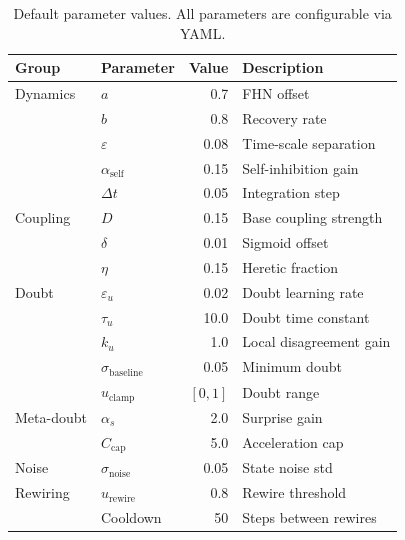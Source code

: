 \documentclass[11pt]{article}
\begin{document}
\begin{table}[ht]
\centering
\caption{Default parameter values. All parameters are configurable via YAML.}
\begin{tabular}{llrl}
\toprule
\textbf{Group} & \textbf{Parameter} & \textbf{Value} & \textbf{Description} \\
\midrule
Dynamics & $a$ & 0.7 & FHN offset \\
         & $b$ & 0.8 & Recovery rate \\
         & $\varepsilon$ & 0.08 & Time-scale separation \\
         & $\alpha_{\text{self}}$ & 0.15 & Self-inhibition gain \\
         & $\Delta t$ & 0.05 & Integration step \\
\midrule
Coupling & $D$ & 0.15 & Base coupling strength \\
         & $\delta$ & 0.01 & Sigmoid offset \\
         & $\eta$ & 0.15 & Heretic fraction \\
\midrule
Doubt    & $\varepsilon_u$ & 0.02 & Doubt learning rate \\
         & $\tau_u$ & 10.0 & Doubt time constant \\
         & $k_u$ & 1.0 & Local disagreement gain \\
         & $\sigma_{\text{baseline}}$ & 0.05 & Minimum doubt \\
         & $u_{\text{clamp}}$ & $[0, 1]$ & Doubt range \\
\midrule
Meta-doubt & $\alpha_s$ & 2.0 & Surprise gain \\
           & $C_{\text{cap}}$ & 5.0 & Acceleration cap \\
\midrule
Noise    & $\sigma_{\text{noise}}$ & 0.05 & State noise std \\
\midrule
Rewiring & $u_{\text{rewire}}$ & 0.8 & Rewire threshold \\
         & Cooldown & 50 & Steps between rewires \\
\bottomrule
\end{tabular}
\end{table}
\end{document}
